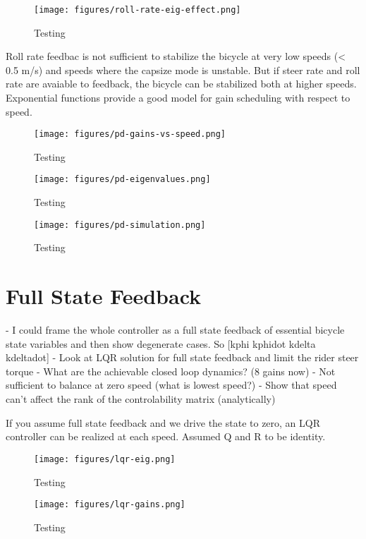 \documentclass[12pt]{article}
\begin{document}
\begin{figure}
  \centering
  \texttt{[image: figures/roll-rate-eig-effect.png]}
  \caption{Testing}
  \label{fig:roll-rate-eig-effect}
\end{figure}

Roll rate feedbac is not sufficient to stabilize the bicycle at very low speeds
(< 0.5 m/s) and speeds where the capsize mode is unstable. But if steer rate
and roll rate are avaiable to feedback, the bicycle can be stabilized both at
higher speeds. Exponential functions provide a good model for gain scheduling
with respect to speed.

\begin{figure}
  \centering
  \texttt{[image: figures/pd-gains-vs-speed.png]}
  \caption{Testing}
  \label{fig:pd-gains-vs-speed}
\end{figure}

\begin{figure}
  \centering
  \texttt{[image: figures/pd-eigenvalues.png]}
  \caption{Testing}
  \label{fig:pd-eigenvalues}
\end{figure}

\begin{figure}
  \centering
  \texttt{[image: figures/pd-simulation.png]}
  \caption{Testing}
  \label{fig:pd_simulation}
\end{figure}

\section{Full State Feedback}

- I could frame the whole controller as a full state feedback of essential
bicycle state variables and then show degenerate cases. So [kphi kphidot kdelta
kdeltadot]
- Look at LQR solution for full state feedback and limit the rider steer torque
- What are the achievable closed loop dynamics? (8 gains now)
- Not sufficient to balance at zero speed (what is lowest speed?)
- Show that speed can't affect the rank of the controlability matrix
(analytically)

If you assume full state feedback and we drive the state to zero, an LQR
controller can be realized at each speed. Assumed Q and R to be identity.

\begin{figure}
  \centering
  \texttt{[image: figures/lqr-eig.png]}
  \caption{Testing}
  \label{fig:lqr-eig}
\end{figure}

\begin{figure}
  \centering
  \texttt{[image: figures/lqr-gains.png]}
  \caption{Testing}
  \label{fig:lqr-gains}
\end{figure}
\end{document}
